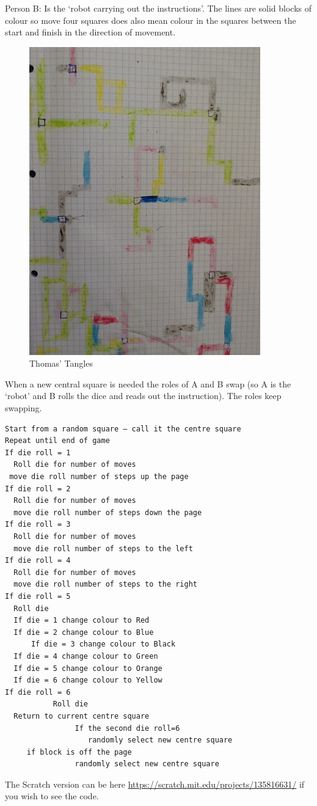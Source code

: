 Person B: Is the ‘robot carrying out the instructions'. The lines are solid blocks of colour so move four squares does also mean colour in the squares between the start and finish in the direction of movement.

\begin{figure}
    \centering
    \includegraphics[width=10cm]{chapters/chapterCT1/figures/tt1.JPG}
    \caption{Thomas' Tangles}
    \label{fig:ThomasTangles1}
\end{figure}

When a new central square is needed the roles of A and B swap (so A is the ‘robot’ and B rolls the dice and reads out the instruction). The roles keep swapping.

\begin{lstlisting}
Start from a random square – call it the centre square
Repeat until end of game
If die roll = 1
  Roll die for number of moves
 move die roll number of steps up the page
If die roll = 2
  Roll die for number of moves
  move die roll number of steps down the page
If die roll = 3
  Roll die for number of moves
  move die roll number of steps to the left 
If die roll = 4
  Roll die for number of moves
  move die roll number of steps to the right
If die roll = 5
  Roll die
  If die = 1 change colour to Red
  If die = 2 change colour to Blue
      If die = 3 change colour to Black
  If die = 4 change colour to Green
  If die = 5 change colour to Orange
  If die = 6 change colour to Yellow
If die roll = 6
           Roll die
  Return to current centre square
                If the second die roll=6
                   randomly select new centre square
     if block is off the page
                randomly select new centre square
\end{lstlisting}

The Scratch version can be here \url{https://scratch.mit.edu/projects/135816631/} if you wish to see the code.

